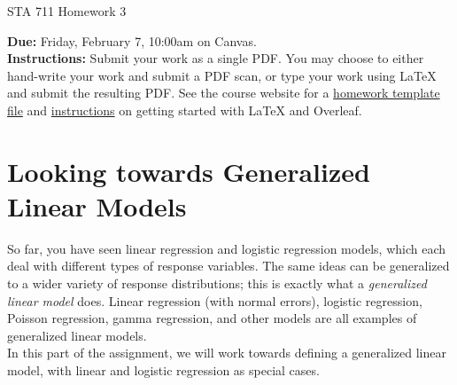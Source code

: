 \documentclass[11pt]{article}
\begin{document}
\begin{center}
\Large
STA 711 Homework 3\\
\normalsize
\vspace{5mm}
\end{center}

\noindent \textbf{Due:} Friday, February 7, 10:00am on Canvas.\\ 

\noindent \textbf{Instructions:} Submit your work as a single PDF. You may choose to either hand-write your work and submit a PDF scan, or type your work using LaTeX and submit the resulting PDF. See the course website for a \href{https://sta711-s25.github.io/homework/hw_template.tex}{homework template file} and \href{https://sta711-s25.github.io/homework/latex_instructions/}{instructions} on getting started with LaTeX and Overleaf.

\section*{Looking towards Generalized Linear Models}

So far, you have seen linear regression and logistic regression models, which each deal with different types of response variables. The same ideas can be generalized to a wider variety of response distributions; this is exactly what a \textit{generalized linear model} does. Linear regression (with normal errors), logistic regression, Poisson regression, gamma regression, and other models are all examples of generalized linear models.\\

\noindent In this part of the assignment, we will work towards defining a generalized linear model, with linear and logistic regression as special cases.
\end{document}
